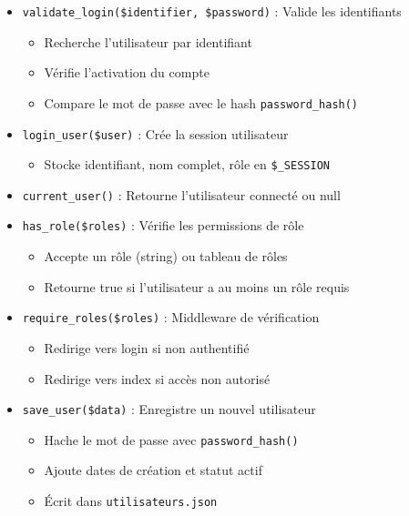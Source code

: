 \documentclass[12pt,a4paper]{report}
\begin{document}
\begin{itemize}
    \item \texttt{validate\_login(\$identifier, \$password)} : Valide les identifiants
        \begin{itemize}
            \item Recherche l'utilisateur par identifiant
            \item Vérifie l'activation du compte
            \item Compare le mot de passe avec le hash \texttt{password\_hash()}
        \end{itemize}
    
    \item \texttt{login\_user(\$user)} : Crée la session utilisateur
        \begin{itemize}
            \item Stocke identifiant, nom complet, rôle en \texttt{\$\_SESSION}
        \end{itemize}
    
    \item \texttt{current\_user()} : Retourne l'utilisateur connecté ou null
    
    \item \texttt{has\_role(\$roles)} : Vérifie les permissions de rôle
        \begin{itemize}
            \item Accepte un rôle (string) ou tableau de rôles
            \item Retourne true si l'utilisateur a au moins un rôle requis
        \end{itemize}
    
    \item \texttt{require\_roles(\$roles)} : Middleware de vérification
        \begin{itemize}
            \item Redirige vers login si non authentifié
            \item Redirige vers index si accès non autorisé
        \end{itemize}
    
    \item \texttt{save\_user(\$data)} : Enregistre un nouvel utilisateur
        \begin{itemize}
            \item Hache le mot de passe avec \texttt{password\_hash()}
            \item Ajoute dates de création et statut actif
            \item Écrit dans \texttt{utilisateurs.json}
        \end{itemize}
\end{itemize}
\end{document}
